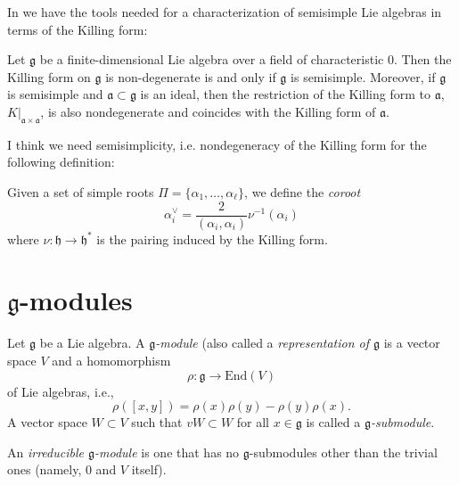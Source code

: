In \cite[Lecture 11]{KLAL} we have the tools needed for a characterization
of semisimple Lie algebras in terms of the Killing form:

\begin{theorem}[Cartan]
\label{theorem-Cartan}
Let $\mathfrak{g}$ be a finite-dimensional Lie algebra
over a field of characteristic 0.
Then the Killing form on $\mathfrak{g}$ is non-degenerate is and only if
$\mathfrak{g}$ is semisimple.
Moreover, if $\mathfrak{g}$ is semisimple and $\mathfrak{a}\subset\mathfrak{g}$
is an ideal,
then the restriction of the Killing form to $\mathfrak{a}$,
$K|_{\mathfrak{a}\times\mathfrak{a}}$,
is also nondegenerate and coincides with the Killing form of $\mathfrak{a}$.
\end{theorem}

I think we need semisimplicity, i.e. nondegeneracy of the
Killing form for the following definition:

\begin{definition}
\label{definition-coroot}
Given a set of simple roots $\Pi=\{\alpha_1,\ldots,\alpha_\ell\}$,
we define the {\it coroot} 
\begin{equation}
\label{equation-coroot}
\alpha_i^\vee=\frac{2}{(\alpha_i,\alpha_i)}\nu^{-1}(\alpha_i)
\end{equation}
where $\nu:\mathfrak{h}\to\mathfrak{h}^*$ is the pairing
induced by the Killing form.
\end{definition}

\section{$\mathfrak{g}$-modules}
\label{section-g-modules}

\begin{definition}
\label{definition-g-module}
Let $\mathfrak{g}$ be a Lie algebra. A {\it $\mathfrak{g}$-module}
(also called a {\it representation of $\mathfrak{g}$}
is a vector space $V$ and a homomorphism
$$
\rho:\mathfrak{g}\to \text{End}(V)
$$
of Lie algebras, i.e.,
$$
\rho([x,y])=\rho(x)\rho(y)-\rho(y)\rho(x).
$$
A vector space $W \subset V$ such that $vW\subset W$ for all
$x \in \mathfrak{g}$ is called a
 {\it $\mathfrak{g}$-submodule}.
\end{definition}

\begin{definition}
\label{definition-irreducible-g-module}
An {\it irreducible $\mathfrak{g}$-module} is one that has
no $\mathfrak{g}$-submodules other than the
trivial ones (namely, 0 and $V$ itself).
\end{definition}

